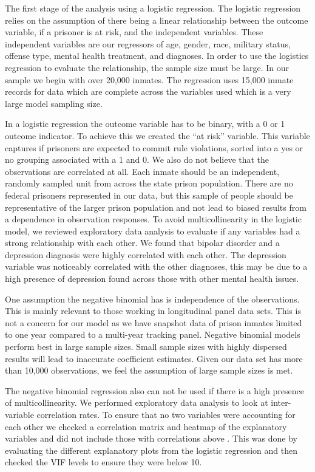\documentclass[
]{article}
\begin{document}
The first stage of the analysis using a logistic regression. The
logistic regression relies on the assumption of there being a linear
relationship between the outcome variable, if a prisoner is at risk, and
the independent variables. These independent variables are our
regressors of age, gender, race, military status, offense type, mental
health treatment, and diagnoses. In order to use the logistics
regression to evaluate the relationship, the sample size must be large.
In our sample we begin with over 20,000 inmates. The regression uses
15,000 inmate records for data which are complete across the variables
used which is a very large model sampling size.

In a logistic regression the outcome variable has to be binary, with a 0
or 1 outcome indicator. To achieve this we created the ``at risk''
variable. This variable captures if prisoners are expected to commit
rule violations, sorted into a yes or no grouping associated with a 1
and 0. We also do not believe that the observations are correlated at
all. Each inmate should be an independent, randomly sampled unit from
across the state prison population. There are no federal prisoners
represented in our data, but this sample of people should be
representative of the larger prison population and not lead to biased
results from a dependence in observation responses. To avoid
multicollinearity in the logistic model, we reviewed exploratory data
analysis to evaluate if any variables had a strong relationship with
each other. We found that bipolar disorder and a depression diagnosis
were highly correlated with each other. The depression variable was
noticeably correlated with the other diagnoses, this may be due to a
high presence of depression found across those with other mental health
issues.

One assumption the negative binomial has is independence of the
observations. This is mainly relevant to those working in longitudinal
panel data sets. This is not a concern for our model as we have snapshot
data of prison inmates limited to one year compared to a multi-year
tracking panel. Negative binomial models perform best in large sample
sizes. Small sample sizes with highly dispersed results will lead to
inaccurate coefficient estimates. Given our data set has more than
10,000 observations, we feel the assumption of large sample sizes is
met.

The negative binomial regression also can not be used if there is a high
presence of multicollinearity. We performed exploratory data analysis to
look at inter-variable correlation rates. To ensure that no two
variables were accounting for each other we checked a correlation matrix
and heatmap of the explanatory variables and did not include those with
correlations above \textbar. This was done by evaluating the
different explanatory plots from the logistic regression and then
checked the VIF levels to ensure they were below 10.
\end{document}
